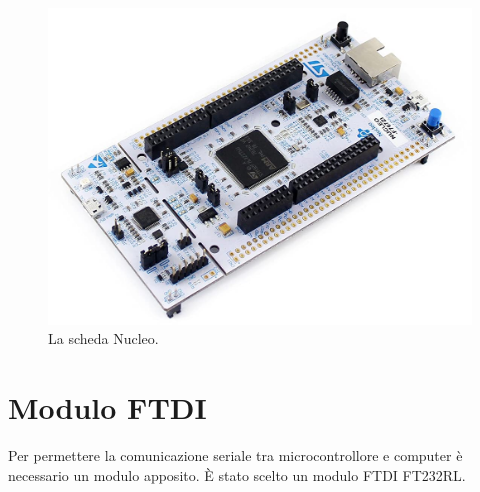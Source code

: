\begin{figure}[H]
\centering
\includegraphics[scale=0.3]{images/nucleo.png}
\caption{La scheda Nucleo.}
\end{figure}

\section{Modulo FTDI}
Per permettere la comunicazione seriale tra microcontrollore e computer è necessario un modulo apposito.
È stato scelto un modulo FTDI FT232RL.
